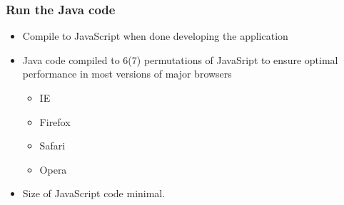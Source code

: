 \begin{frame}[red] %
\frametitle{Run the Java code}

\begin{itemize}
\item Compile to JavaScript when done developing the application

\item Java code compiled to 6(7) permutations of JavaSript to ensure optimal 
performance in most versions of major browsers
\begin{itemize} \item IE\item Firefox\item Safari\item Opera\end{itemize}
\item Size of JavaScript code minimal.
\end{itemize}

\end{frame}


